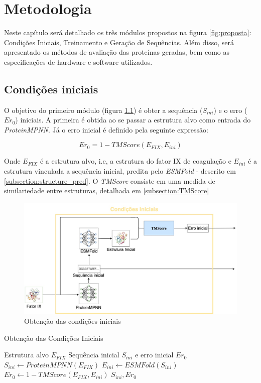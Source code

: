 \chapter{Metodologia}

Neste capítulo será detalhado os três módulos propostos na figura \ref{fig:proposta}: 
Condições Iniciais, Treinamento e Geração de Sequências. 
Além disso, será apresentado os métodos de avaliação das proteínas geradas,
bem como as especificações de hardware e software utilizados. 


\section{Condições iniciais}
O objetivo do primeiro módulo (figura \ref{fig:cond_iniciais}) é obter a sequência ($S_{ini}$) e o erro ($Er_{0}$) iniciais. 
A primeira é obtida ao se passar a estrutura alvo como entrada do \textit{ProteinMPNN}.
Já o erro inicial é definido pela seguinte expressão:
 
\begin{equation}
    Er_{0} = 1 - TMScore(E_{FIX}, E_{ini})
\end{equation}

\noindent
Onde $E_{FIX}$ é a estrutura alvo, i.e, a estrutura do fator IX de coagulação e $E_{ini}$ é a estrutura vinculada a sequência inicial, 
predita pelo \textit{ESMFold} - descrito em \ref{subsection:structure_pred}. 
O \textit{TMScore} consiste em uma medida de similariedade entre estruturas, detalhada em \ref{subsection:TMScore}

\begin{figure}[H]
  \centering
  \includegraphics[width=.8\textwidth]{figuras/metodologia-Initial_cond.jpg}
  \caption{Obtenção das condições iniciais}
  \label{fig:cond_iniciais}
\end{figure}

\begin{algorithm}
  \caption{Obtenção das Condições Iniciais}
  \label{alg:initial_conditions}
  \begin{algorithmic}[1]
  \Require Estrutura alvo $E_{FIX}$
  \Ensure Sequência inicial $S_{ini}$ e erro inicial $Er_{0}$
  \State $S_{ini} \gets \textit{ProteinMPNN}(E_{FIX})$
  \State $E_{ini} \gets \textit{ESMFold}(S_{ini})$
  \State $Er_{0} \gets 1 - \textit{TMScore}(E_{FIX}, E_{ini})$
  \State \Return $S_{ini}, Er_{0}$
  \end{algorithmic}
  \end{algorithm}

